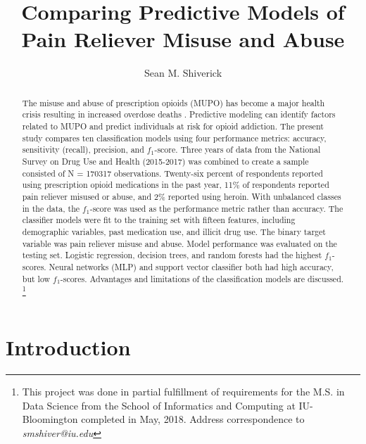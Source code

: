 \documentclass[sigconf]{acmart}
\begin{document}
  \title{Comparing Predictive Models of Pain Reliever Misuse and Abuse}
  \author{Sean M. Shiverick}
\renewcommand{\shortauthors}{S.M. Shiverick}


\begin{abstract}

The misuse and abuse of prescription opioids (MUPO) has become a major 
health crisis resulting in increased overdose deaths \cite{nida18}. Predictive 
modeling can identify factors related to MUPO and  predict individuals at risk 
for opioid addiction. The present study compares ten classification models 
using four performance metrics: accuracy, sensitivity (recall), precision, and 
$f_1$-score. Three years of data from the National Survey on Drug Use and 
Health (2015-2017) was combined to create a sample consisted of N = 170317
observations. Twenty-six percent of respondents reported using prescription
opioid medications in the past year, 11\% of respondents reported pain 
reliever misused or abuse, and 2\% reported using heroin. With unbalanced 
classes in the data, the $f_1$-score was used as the performance metric 
rather than accuracy. The classifier models were fit to the training set with 
fifteen features, including demographic variables, past medication use, and 
illicit drug use. The binary target variable was pain reliever misuse and abuse. 
Model performance was evaluated on the testing set. Logistic regression, 
decision trees, and random forests had the highest $f_1$-scores. Neural networks 
(MLP) and support vector classifier both had high accuracy, but low $f_1$-scores. Advantages and limitations of the classification models are discussed. 
\footnote{This project was done in partial fulfillment of requirements 
for the M.S. in Data Science from the School of Informatics and Computing at 
IU-Bloomington completed in May, 2018. Address correspondence to \textit{smshiver@iu.edu}}

\end{abstract}
\maketitle

\section{Introduction}
\end{document}
